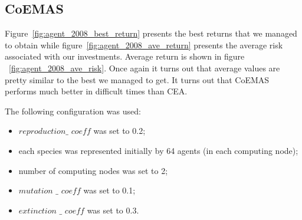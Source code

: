 \subsection{CoEMAS}

Figure~\ref{fig:agent_2008_best_return} presents the best returns that we managed to obtain
  while  figure~\ref{fig:agent_2008_ave_return} presents the average risk associated with our investments.
Average return is shown in figure ~\ref{fig:agent_2008_ave_risk}.
Once again it turns out that average values are pretty similar to the best we managed to get. 
It turns out that CoEMAS performs much better in difficult times than CEA.

The following configuration was used:
\begin{itemize}
  \item $reproduction\_$ $coeff$ was set to 0.2;
  \item each species was represented initially by 64 agents (in each computing node);
  \item number of computing nodes was set to 2;
  \item $mutation$ $\_$ $coeff$ was set to 0.1;
  \item $extinction$ $\_$ $coeff$ was set to 0.3.
\end{itemize}

